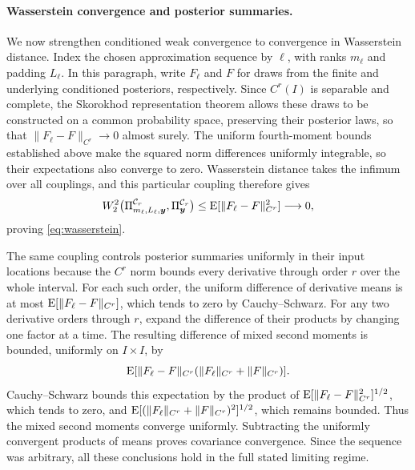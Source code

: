 \begin{proofEnd}
\paragraph{Wasserstein convergence and posterior summaries.}
We now strengthen conditioned weak convergence to convergence in
Wasserstein distance. Index the chosen approximation sequence by
$\ell$, with ranks $m_\ell$ and padding $L_\ell$. In this paragraph,
write $F_\ell$ and $F$ for draws from the finite and underlying
conditioned posteriors, respectively. Since $C^r(I)$ is separable
and complete, the Skorokhod representation theorem
\citep[Theorem 6.7]{billingsley1999convergence} allows these draws
to be constructed on a common probability space, preserving their
posterior laws, so that $\|F_\ell-F\|_{C^r}\to0$ almost surely.
The uniform fourth-moment bounds established above make the squared
norm differences uniformly integrable, so their expectations also
converge to zero. Wasserstein distance takes the infimum over all
couplings, and this particular coupling therefore gives
\[
 W_2^2\bigl(\Pi_{m_\ell,L_\ell,\boldsymbol y}^{\mathcal C_r},
            \Pi_{\boldsymbol y}^{\mathcal C_r}\bigr)
 \leq \operatorname{E}[\|F_\ell-F\|_{C^r}^2]\longrightarrow0,
\]
proving \cref{eq:wasserstein}.

The same coupling controls posterior summaries uniformly in their
input locations because the $C^r$ norm bounds every derivative through
order $r$ over the whole interval. For each such order, the uniform
difference of derivative means is at most
$\operatorname{E}[\|F_\ell-F\|_{C^r}]$, which tends to zero by Cauchy--Schwarz.
For any two derivative orders through $r$, expand the difference of
their products by changing one factor at a time. The resulting
difference of mixed second moments is bounded, uniformly on
$I\times I$, by
\[
 \operatorname{E}[\|F_\ell-F\|_{C^r}(\|F_\ell\|_{C^r}+\|F\|_{C^r})].
\]
Cauchy--Schwarz bounds this expectation by the product of
$\operatorname{E}[\|F_\ell-F\|_{C^r}^2]^{1/2}$, which tends to zero, and
$\operatorname{E}[(\|F_\ell\|_{C^r}+\|F\|_{C^r})^2]^{1/2}$, which remains bounded.
Thus the mixed second moments converge uniformly. Subtracting the
uniformly convergent products of means proves covariance convergence.
Since the sequence was arbitrary, all these conclusions hold in the
full stated limiting regime.
\end{proofEnd}

